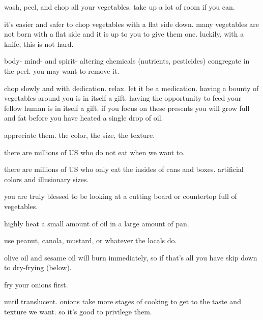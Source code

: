 \begin{algorithm}

  \item wash, peel, and chop all your vegetables. take up a lot of room if you 
  can.
  \begin{ingredients}
    \item it's easier and safer to chop vegetables with a flat side down. many vegetables are not born with a flat side and it is up to you to give them one. luckily, with a knife, this is not hard.
    \item body- mind- and spirit- altering chemicals (nutrients, pesticides) congregate in the peel. you may want to remove it.
    \item chop slowly and with dedication. relax. let it be a medication. having a bounty of vegetables around you is in itself a gift. having the opportunity to feed your fellow human is in itself a gift. if you focus on these presents you will grow full and fat before you have heated a single drop of oil.
  \end{ingredients}

  \item appreciate them. the color, the size, the texture.
  \begin{ingredients}
    \item there are millions of US who do not eat when we want to.
    \item there are millions of US who only eat the insides of cans and boxes. artificial colors and illusionary sizes.
    \item you are truly blessed to be looking at a cutting board or countertop full of vegetables.
  \end{ingredients}

  \item highly heat a small amount of oil in a large amount of pan.
  \begin{ingredients}
    \item use peanut, canola, mustard, or whatever the locals do.
    \item olive oil and sesame oil will burn immediately, so if that's all you have skip down to dry-frying (below).
  \end{ingredients}

  \item fry your onions first.
  \begin{ingredients}
    \item until translucent. onions take more stages of cooking to get to the taste and texture we want. so it's good to privilege them.
  \end{ingredients}
  

\end{algorithm}
